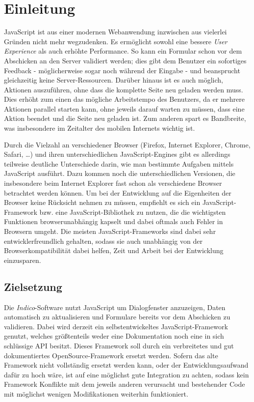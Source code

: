 \chapter{Einleitung}

JavaScript ist aus einer modernen Webanwendung inzwischen aus vielerlei Gründen nicht mehr
wegzudenken. Es ermöglicht sowohl eine bessere \emph{User Experience} als auch erhöhte Performance.
So kann ein Formular schon vor dem Abschicken an den Server validiert werden; dies gibt
dem Benutzer ein sofortiges Feedback - möglicherweise sogar noch während der Eingabe - und
beansprucht gleichzeitig keine Server-Ressourcen. Darüber hinaus ist es auch möglich, Aktionen
auszuführen, ohne dass die komplette Seite neu geladen werden muss. Dies erhöht zum einen das
mögliche Arbeitstempo des Benutzers, da er mehrere Aktionen parallel starten kann, ohne jeweils darauf
warten zu müssen, dass eine Aktion beendet und die Seite neu geladen ist. Zum anderen spart es
Bandbreite, was insbesondere im Zeitalter des mobilen Internets wichtig ist.

Durch die Vielzahl an verschiedener Browser (Firefox, Internet Explorer, Chrome, Safari, \ldots) und ihren
unterschiedlichen JavaScript-Engines gibt es allerdings teilweise deutliche Unterschiede darin, wie
man bestimmte Aufgaben mittels JavaScript ausführt. Dazu kommen noch die unterschiedlichen Versionen,
die insbesondere beim Internet Explorer fast schon als verschiedene Browser betrachtet werden
können. Um bei der Entwicklung auf die Eigenheiten der Browser keine Rücksicht nehmen zu müssen,
empfiehlt es sich ein JavaScript-Framework bzw. eine JavaScript-Bibliothek zu nutzen, die die
wichtigsten Funktionen browserunabhängig kapselt und dabei oftmals auch Fehler in Browsern umgeht.
Die meisten JavaScript-Frameworks sind dabei sehr entwicklerfreundlich gehalten, sodass sie auch
unabhängig von der Browserkompatibilität dabei helfen, Zeit und Arbeit bei der Entwicklung
einzusparen.


\section{Zielsetzung}

Die \emph{Indico}-Software nutzt JavaScript um Dialogfenster anzuzeigen, Daten automatisch zu
aktualisieren und Formulare bereits vor dem Abschicken zu validieren. Dabei wird derzeit ein
selbstentwickeltes JavaScript-Framework genutzt, welches größtenteils weder eine Dokumentation
noch eine in sich schlüssige API besitzt. Dieses Framework soll durch ein verbreitetes und gut
dokumentiertes OpenSource-Framework ersetzt werden. Sofern das alte Framework nicht vollständig
ersetzt werden kann, oder der Entwicklungsaufwand dafür zu hoch wäre, ist auf eine möglichst gute
Integration zu achten, sodass kein Framework Konflikte mit dem jeweils anderen verursacht und
bestehender Code mit möglichst wenigen Modifikationen weiterhin funktioniert.

